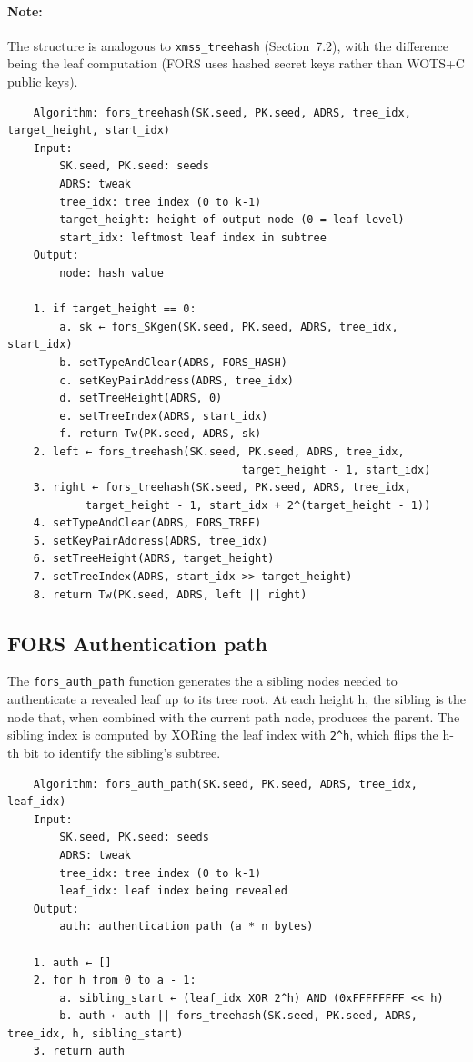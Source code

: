\paragraph{Note:} The structure is analogous to \texttt{xmss\_treehash} (Section~7.2), with the difference being the leaf computation (FORS uses hashed secret keys rather than WOTS+C public keys).
\begin{verbatim}
    Algorithm: fors_treehash(SK.seed, PK.seed, ADRS, tree_idx, target_height, start_idx)
    Input:
        SK.seed, PK.seed: seeds
        ADRS: tweak
        tree_idx: tree index (0 to k-1)
        target_height: height of output node (0 = leaf level)
        start_idx: leftmost leaf index in subtree
    Output:
        node: hash value

    1. if target_height == 0:
        a. sk ← fors_SKgen(SK.seed, PK.seed, ADRS, tree_idx, start_idx)
        b. setTypeAndClear(ADRS, FORS_HASH)
        c. setKeyPairAddress(ADRS, tree_idx)
        d. setTreeHeight(ADRS, 0)
        e. setTreeIndex(ADRS, start_idx)
        f. return Tw(PK.seed, ADRS, sk)
    2. left ← fors_treehash(SK.seed, PK.seed, ADRS, tree_idx, 
                                    target_height - 1, start_idx)
    3. right ← fors_treehash(SK.seed, PK.seed, ADRS, tree_idx, 
            target_height - 1, start_idx + 2^(target_height - 1))
    4. setTypeAndClear(ADRS, FORS_TREE)
    5. setKeyPairAddress(ADRS, tree_idx)
    6. setTreeHeight(ADRS, target_height)
    7. setTreeIndex(ADRS, start_idx >> target_height)
    8. return Tw(PK.seed, ADRS, left || right)
\end{verbatim}

\subsection{FORS Authentication path}
The \texttt{fors\_auth\_path} function generates the a sibling nodes needed to authenticate a revealed leaf up to its tree root. At each height h, the sibling is the node that, when combined with the current path node, produces the parent. The sibling index is computed by XORing the leaf index with \texttt{2\string^h}, which flips the h-th bit to identify the sibling's subtree.
\begin{verbatim}
    Algorithm: fors_auth_path(SK.seed, PK.seed, ADRS, tree_idx, leaf_idx)
    Input:
        SK.seed, PK.seed: seeds
        ADRS: tweak
        tree_idx: tree index (0 to k-1)
        leaf_idx: leaf index being revealed
    Output:
        auth: authentication path (a * n bytes)

    1. auth ← []
    2. for h from 0 to a - 1:
        a. sibling_start ← (leaf_idx XOR 2^h) AND (0xFFFFFFFF << h)
        b. auth ← auth || fors_treehash(SK.seed, PK.seed, ADRS, tree_idx, h, sibling_start)
    3. return auth
\end{verbatim}


